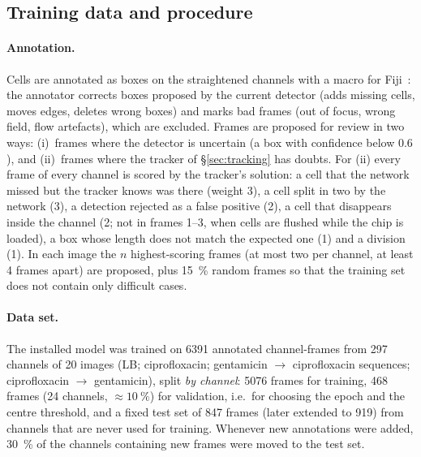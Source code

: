 \documentclass[11pt,a4paper]{article}
\begin{document}
\subsection{Training data and procedure}\label{sec:training}
\paragraph{Annotation.} Cells are annotated as boxes on the straightened channels with a macro for Fiji~\cite{schindelin2012}: the annotator corrects boxes proposed by the current detector (adds missing cells, moves edges, deletes wrong boxes) and marks bad frames (out of focus, wrong field, flow artefacts), which are excluded. Frames are proposed for review in two ways: (i)~frames where the detector is uncertain (a box with confidence below $0.6$), and (ii)~frames where the tracker of \S\ref{sec:tracking} has doubts. For (ii) every frame of every channel is scored by the tracker's solution: a cell that the network missed but the tracker knows was there (weight 3), a cell split in two by the network (3), a detection rejected as a false positive (2), a cell that disappears inside the channel (2; not in frames 1--3, when cells are flushed while the chip is loaded), a box whose length does not match the expected one (1) and a division (1). In each image the $n$ highest-scoring frames (at most two per channel, at least 4 frames apart) are proposed, plus \SI{15}{\percent} random frames so that the training set does not contain only difficult cases.

\paragraph{Data set.} The installed model was trained on \num{6391} annotated channel-frames from 297 channels of 20 images (LB; ciprofloxacin; gentamicin $\to$ ciprofloxacin sequences; ciprofloxacin $\to$ gentamicin), split \emph{by channel}: \num{5076} frames for training, 468 frames (24 channels, $\approx\SI{10}{\percent}$) for validation, i.e.\ for choosing the epoch and the centre threshold, and a fixed test set of 847 frames (later extended to 919) from channels that are never used for training. Whenever new annotations were added, \SI{30}{\percent} of the channels containing new frames were moved to the test set.
\end{document}
